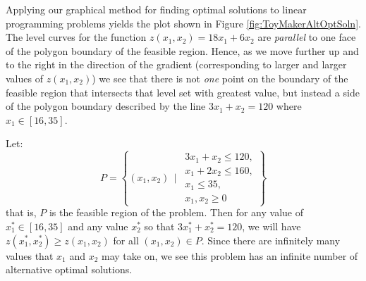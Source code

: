 \begin{solution}
Applying our graphical method for finding optimal solutions to linear programming problems yields the plot shown in Figure \ref{fig:ToyMakerAltOptSoln}. The level curves for the function $z(x_1,x_2) = 18x_1 + 6x_2$ are \textit{parallel} to one face of the polygon boundary of the feasible region. Hence, as we move further up and to the right in the direction of the gradient (corresponding to larger and larger values of $z(x_1, x_2)$) we see that there is not \textit{one} point on the boundary of the feasible region that intersects that level set with greatest value, but instead a side of the polygon boundary described by the line $3x_1 + x_2 = 120$ where $x_1 \in [16, 35]$. 

Let:
\begin{displaymath}
P = \left\{(x_1,x_2) \ \  | \ \ \begin{array}{cc}3x_1 + x_2 \leq 120,\\ x_1 + 2x_2 \leq 160,\\ x_1 \leq 35,\\ x_1,x_2 \geq 0\end{array}  \right\}
\end{displaymath} 
that is, $P$ is the feasible region of the problem. Then for any value of $x_1^* \in [16,35]$ and any value $x_2^*$ so that  $3x_1^* + x_2^* = 120$, we will have $z(x_1^*, x_2^*) \geq z(x_1, x_2)$ for all $(x_1,x_2) \in P$. Since there are infinitely many values that $x_1$ and $x_2$  may take on, we see this problem has an infinite number of alternative optimal solutions.
\begin{figure}[H]
\centering
\begin{center}
\end{center}
\end{figure}
\end{solution}
